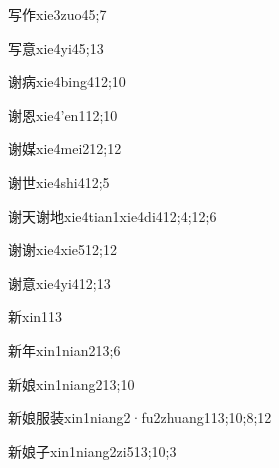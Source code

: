 \begin{verbete}{写作}{xie3zuo4}{5;7}
\end{verbete}
\begin{verbete}{写意}{xie4yi4}{5;13}
\end{verbete}
\begin{verbete}{谢病}{xie4bing4}{12;10}
\end{verbete}
\begin{verbete}{谢恩}{xie4'en1}{12;10}
\end{verbete}
\begin{verbete}{谢媒}{xie4mei2}{12;12}
\end{verbete}
\begin{verbete}{谢世}{xie4shi4}{12;5}
\end{verbete}
\begin{verbete}{谢天谢地}{xie4tian1xie4di4}{12;4;12;6}
\end{verbete}
\begin{verbete}{谢谢}{xie4xie5}{12;12}
\end{verbete}
\begin{verbete}{谢意}{xie4yi4}{12;13}
\end{verbete}
\begin{verbete}{新}{xin1}{13}
\end{verbete}
\begin{verbete}{新年}{xin1nian2}{13;6}
\end{verbete}
\begin{verbete}{新娘}{xin1niang2}{13;10}
\end{verbete}
\begin{verbete}{新娘服装}{xin1niang2·fu2zhuang1}{13;10;8;12}
\end{verbete}
\begin{verbete}{新娘子}{xin1niang2zi5}{13;10;3}
\end{verbete}
